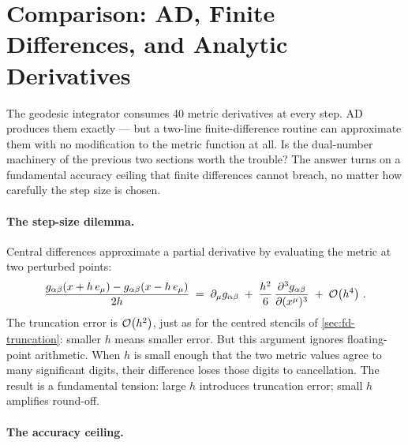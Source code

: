 \section{Comparison: AD, Finite Differences, and Analytic Derivatives}
\label{sec:ad-comparison}

The geodesic integrator consumes 40 metric derivatives at
every step.  AD produces them exactly --- but a two-line
finite-difference routine can approximate them with no
modification to the metric function at all.  Is the
dual-number machinery of the previous two sections worth the
trouble?  The answer turns on a fundamental accuracy ceiling
that finite differences cannot breach, no matter how
carefully the step size is chosen.

\paragraph{The step-size dilemma.}

Central differences approximate a partial derivative by
evaluating the metric at two perturbed points:
%
\begin{equation}
  \frac{g_{\alpha\beta}(x + h\,e_\mu)
      - g_{\alpha\beta}(x - h\,e_\mu)}{2h}
    \;=\; \partial_{\mu} g_{\alpha\beta}
    \;+\; \frac{h^2}{6}\,
      \frac{\partial^3 g_{\alpha\beta}}{\partial(x^\mu)^3}
    \;+\; \mathcal{O}\!\left(h^4\right) \,.
  \label{eq:fd-central-metric}
\end{equation}
%
The truncation error is $\mathcal{O}\!\left(h^2\right)$, just as for the
centred stencils of \cref{sec:fd-truncation}: smaller $h$
means smaller error.  But this argument ignores
floating-point arithmetic.  When $h$ is small enough that
the two metric values agree to many significant digits,
their difference loses those digits to cancellation.  The
result is a fundamental tension: large $h$ introduces
truncation error; small $h$ amplifies round-off.

\paragraph{The accuracy ceiling.}


